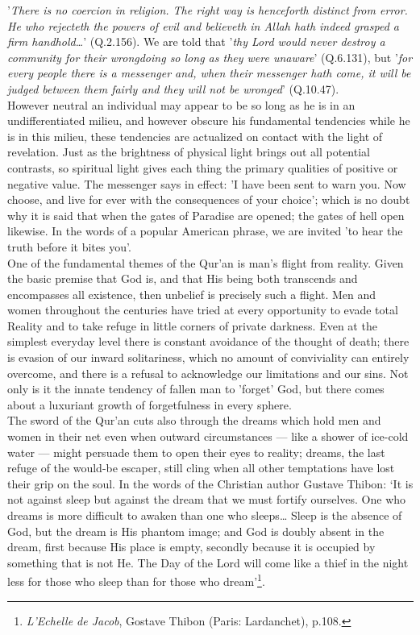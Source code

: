\documentclass[10pt, twoside,openright]{book}
\begin{document}
'\emph{There is no coercion in religion. The right way is henceforth distinct from error. He who rejecteth 
the powers of evil and believeth in Allah hath indeed grasped a firm handhold\ldots{}}' (Q.2.156). We are 
told that '\emph{thy Lord would never destroy a community for their wrongdoing so long as they were 
unaware}' (Q.6.131), but '\emph{for every people there is a messenger and, when their messenger hath come, it will be judged between them fairly and they will not be wronged}' (Q.10.47). \\

However neutral an individual may appear to be so long as he is in an undifferentiated milieu, and 
however obscure his fundamental tendencies while he is in this milieu, these tendencies are 
actualized on contact with the light of revelation. Just as the brightness of physical light brings 
out all potential contrasts, so spiritual light gives each thing the primary qualities of positive or 
negative value. The messenger says in effect: 'I have been sent to warn you. Now choose, and live for 
ever with the consequences of your choice'; which is no doubt why it is said that when the gates of 
Paradise are opened; the gates of hell open likewise. In the words of a popular American phrase, we 
are invited 'to hear the truth before it bites you'. \\

One of the fundamental themes of the Qur'an is man's flight from reality. Given the basic premise 
that God is, and that His being both transcends and encompasses all existence, then unbelief is 
precisely such a flight. Men and women throughout the centuries have tried at every opportunity to 
evade total Reality and to take refuge in little corners of private darkness. Even at the simplest 
everyday level there is constant avoidance of the thought of death; there is evasion of our inward 
solitariness, which no amount of conviviality can entirely overcome, and there is a refusal to 
acknowledge our limitations and our sins. Not only is it the innate tendency of fallen man to 
'forget' God, but there comes about a luxuriant growth of forgetfulness in every sphere. \\

The sword of the Qur'an cuts also through the dreams which hold men and women in their net even when 
outward circumstances --- like a shower of ice-cold water --- might persuade them to open their eyes to 
reality; dreams, the last refuge of the would\hyp{}be escaper, still cling when all other temptations have 
lost their grip on the soul. In the words of the Christian author Gustave Thibon: `It is not against 
sleep but against the dream that we must fortify ourselves. One who dreams is more difficult to 
awaken than one who sleeps\ldots{} Sleep is the absence of God, but the dream is His phantom image; and God is doubly absent in the dream, first because His place is empty, secondly because it is occupied 
by something that is not He. The Day of the Lord will come like a thief in the night less for those 
who sleep than for those who dream'\footnote{\emph{L'Echelle de Jacob}, Gostave Thibon (Paris: Lardanchet), p.108.}.\\
\end{document}
